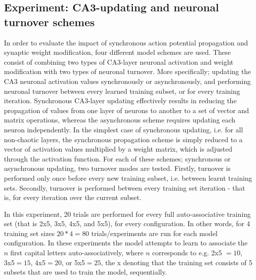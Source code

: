 \subsection{Experiment: CA3-updating and neuronal turnover schemes}

In order to evaluate the impact of synchronous action potential propagation and synaptic weight modification, four different model schemes are used. These consist of combining two types of CA3-layer neuronal activation and weight modification with two types of neuronal turnover. More specifically; updating the CA3 neuronal activation values synchronously or asynchronously, and performing neuronal turnover between every learned training subset, or for every training iteration. Synchronous CA3-layer updating effectively results in reducing the propagation of values from one layer of neurons to another to a set of vector and matrix operations, whereas the asynchronous scheme requires updating each neuron independently. In the simplest case of synchronous updating, i.e. for all non-chaotic layers, the synchronous propagation scheme is simply reduced to a vector of activation values multiplied by a weight matrix, which is adjusted through the activation function. For each of these schemes; synchronous or asynchronous updating, two turnover modes are tested. Firstly, turnover is performed only once before every new training subset, i.e. between learnt training sets. Secondly, turnover is performed between every training set iteration - that is, for every iteration over the current subset.

In this experiment, 20 trials are performed for every full auto-associative training set (that is 2x5, 3x5, 4x5, and 5x5), for every configuration. In other words, for 4 training set sizes $20 * 4 = 80$ trials/experiments are run for each model configuration. In these experiments the model attempts to learn to associate the $n$ first capital letters auto-associatively, where $n$ corresponds to e.g. 2x5 $=10$, 3x5$=15$, 4x5$=20$, or 5x5$=25$, the x denoting that the training set consists of 5 subsets that are used to train the model, sequentially.

